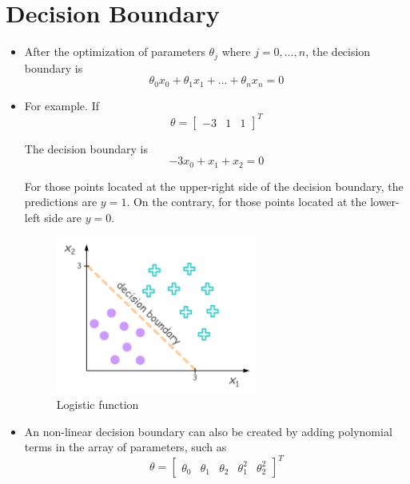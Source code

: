 \section{Decision Boundary}
\begin{itemize}
    \item After the optimization of parameters $\theta_j$ where $j=0,\dots,n$, the decision boundary is
    \begin{equation}
        \theta_0 x_0 + \theta_1 x_1 + \dots + \theta_n x_n = 0
    \end{equation}
    
    \item For example. If
    \begin{equation}
        \theta = 
        \left[\begin{array}{ccc} -3 & 1 & 1 \end{array}\right]^T
    \end{equation}
    
    The decision boundary is
    \begin{equation}
        -3 x_0 + x_1 + x_2 = 0
    \end{equation}

    For those points located at the upper-right side of the decision boundary, the predictions are $y=1$.
    On the contrary, for those points located at the lower-left side are $y=0$.
    \begin{figure}[!htbp]
        \centering
        \includegraphics[width=2.6in]{./images/decision boundary.png}
        \caption{Logistic function}
    \end{figure}
    
    \item An non-linear decision boundary can also be created by adding polynomial terms in the array of parameters, such as
    \begin{equation}
        \theta = 
        \left[\begin{array}{ccccc} \theta_0 & \theta_1 & \theta_2 & \theta_1^2 & \theta_2^2 \end{array}\right]^T
    \end{equation}
    

\end{itemize}
